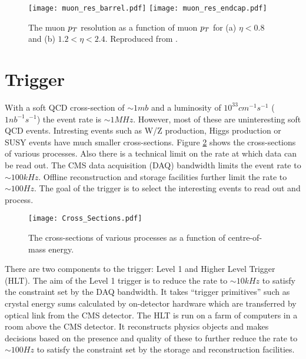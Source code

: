 \begin{figure}
\texttt{[image: muon\_res\_barrel.pdf]}
\texttt{[image: muon\_res\_endcap.pdf]}
\caption{The muon $p_{T}$ resolution as a function of muon $p_{T}$ for (a) $\eta <
0.8$ and (b) $1.2 < \eta < 2.4$. Reproduced from \cite{muon_resolution}.}
\label{fig:muon_resolution}
\end{figure}

\section{Trigger}

With a soft QCD cross-section of $\sim1\unit{mb}$ and a luminosity of
$10^{33}\unit{cm^{-1}s^{-1}}$ ($1\unit{nb^{-1}s^{-1}}$) the event rate is $\sim 
1\unit{MHz}$. However, most of these are uninteresting soft QCD events. 
Intresting events such as W/Z production, Higgs production or SUSY events have 
much smaller cross-sections. Figure \ref{fig:cross_sections} shows the 
cross-sections of various processes. Also there is a technical limit on the rate 
at which data can be read out. The CMS data acquisition (DAQ) bandwidth limits 
the event rate to $\sim 100\unit{kHz}$. Offline reconstruction and storage 
facilities further limit the rate to $\sim 100\unit{Hz}$. The goal of the 
trigger is to select the interesting events to read out and process. \\

\begin{figure}
\begin{center}
\texttt{[image: Cross\_Sections.pdf]}
\end{center}
\caption{The cross-sections of various processes as a function of centre-of-mass
energy.}
\label{fig:cross_sections}
\end{figure}

There are two components to the trigger: Level 1 and Higher Level Trigger (HLT). 
The aim of the Level 1 trigger is to reduce the rate to $\sim 10\unit{kHz}$ to 
satisfy the constraint set by the DAQ bandwidth. It takes ``trigger primitives'' 
such as crystal energy sums calculated by on-detector hardware which are 
transferred by optical link from the CMS detector. The HLT is run on a farm of 
computers in a room above the CMS detector. It reconstructs physics objects and 
makes decisions based on the presence and quality of these to further reduce 
the rate to $\sim 100\unit{Hz}$ to satisfy the constraint set by the storage and 
reconstruction facilities.

